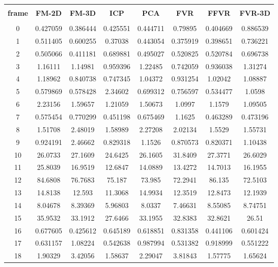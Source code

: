 \begin{center}
\begin{longtable}{cccccccc}
\hline \\
\textbf{frame} & \textbf{FM-2D} & \textbf{FM-3D} & \textbf{ICP} & \textbf{PCA} & \textbf{FVR} & \textbf{FFVR} & \textbf{FVR-3D} \\
\hline \\
0 & 0.427059 & 0.386444 & 0.425551 & 0.444711 & 0.79895 & 0.404669 & 0.886539\\
1 & 0.511405 & 0.600255 & 0.37038 & 0.443054 & 0.375919 & 0.398651 & 0.736221\\
2 & 0.505066 & 0.411181 & 0.689881 & 0.495027 & 0.520825 & 0.520784 & 0.696738\\
3 & 1.16111 & 1.14981 & 0.959396 & 1.22485 & 0.742059 & 0.936038 & 1.31274\\
4 & 1.18962 & 0.840738 & 0.747345 & 1.04372 & 0.931254 & 1.02042 & 1.08887\\
5 & 0.579869 & 0.578428 & 2.34602 & 0.699312 & 0.756597 & 0.534477 & 1.0598\\
6 & 2.23156 & 1.59657 & 1.21059 & 1.50673 & 1.0997 & 1.1579 & 1.09505\\
7 & 0.575454 & 0.770299 & 0.451198 & 0.675469 & 1.1625 & 0.463289 & 0.473196\\
8 & 1.51708 & 2.48019 & 1.58989 & 2.27208 & 2.02134 & 1.5529 & 1.55731\\
9 & 0.924191 & 2.46662 & 0.829318 & 1.1526 & 0.870573 & 0.820371 & 1.10438\\
10 & 26.0733 & 27.1609 & 24.6425 & 26.1605 & 31.8409 & 27.3771 & 26.6029\\
11 & 25.8039 & 16.9519 & 12.6847 & 14.0889 & 13.4272 & 14.7013 & 16.1955\\
12 & 84.6808 & 76.7683 & 75.187 & 73.985 & 72.2941 & 86.135 & 72.5103\\
13 & 14.8138 & 12.593 & 11.3068 & 14.9934 & 12.3519 & 12.8473 & 12.1939\\
14 & 8.04678 & 8.39369 & 5.96803 & 8.0337 & 7.46631 & 8.55085 & 8.74751\\
15 & 35.9532 & 33.1912 & 27.6466 & 33.1955 & 32.8383 & 32.8621 & 26.51\\
16 & 0.677605 & 0.425612 & 0.645189 & 0.618851 & 0.831358 & 0.441106 & 0.601424\\
17 & 0.631157 & 1.08224 & 0.542638 & 0.987994 & 0.531382 & 0.918999 & 0.551222\\
18 & 1.90329 & 3.42056 & 1.58637 & 2.29047 & 3.81843 & 1.57775 & 1.65624\\

\end{longtable}
\end{center}
